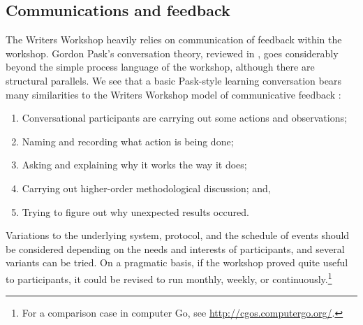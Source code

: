 \subsection{Communications and feedback}

The Writers Workshop heavily relies on communication of feedback within the workshop.
 Gordon Pask's conversation theory, reviewed in
\cite{conversation-theory-review,boyd2004conversation}, goes
considerably beyond the simple process language of the workshop,
although there are structural parallels.  We see that a basic Pask-style
learning conversation bears many similarities to the Writers Workshop model of communicative feedback
\cite[p. 190]{boyd2004conversation}: 

\begin{center}
\begin{fminipage}{.8\columnwidth}
\begin{minipage}{1\textwidth}
\begin{enumerate}[itemsep=0pt,rightmargin=10pt]
\item Conversational participants are carrying
out some actions and observations;
\item Naming and recording what action is being done;
\item Asking and explaining why it works the way
it does;
\item Carrying out higher-order methodological discussion; and, 
\item Trying to figure out why unexpected results occured.
\end{enumerate}
\end{minipage}
\end{fminipage}
\end{center}

Variations to the underlying system, protocol, and the schedule of
events should be considered depending on the needs and interests of
participants, and several variants can be tried.  On a pragmatic
basis, if the workshop proved quite useful to participants, it could
be revised to run monthly, weekly, or continuously.\footnote{For a
  comparison case in computer Go, see
  \url{http://cgos.computergo.org/}.}






